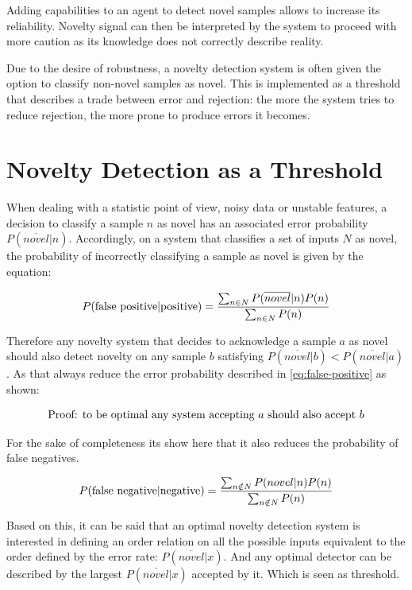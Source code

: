 Adding capabilities to an agent to detect novel samples allows to increase its
reliability. Novelty signal can then be interpreted by the system to proceed
with more caution as its knowledge does not correctly describe reality.

Due to the desire of robustness, a novelty detection system is often given the option
to classify non-novel samples as novel. This is implemented as a threshold that describes a trade
between error and rejection: the more the system tries to reduce rejection, the more
prone to produce errors it becomes.



\section{Novelty Detection as a Threshold}
When dealing with a statistic point of view, noisy data or unstable features,
a decision to classify a sample $n$ as novel has an associated error probability
$P(\overline{novel}|n)$.
Accordingly, on a system that classifies a set of inputs $N$ as novel, the
probability of incorrectly classifying a sample as novel is given by the
equation:

\begin{equation}
\label{eq:false-positive}
P(\textnormal{false positive}|\textnormal{positive}) = \frac{\sum_{n \in N}{P(\overline{novel}|n)P(n)}}{\sum_{n \in N}{P(n)}}
\end{equation}

Therefore any novelty system that decides to acknowledge a sample
$a$ as novel should also detect novelty on any sample $b$ satisfying
$P(\overline{novel}|b) < P(\overline{novel}|a)$.
As that always reduce the error probability described in
\autoref{eq:false-positive} as shown:

\begin{equation}
\textnormal{Proof: to be optimal any system accepting }a\textnormal{ should also accept }b
\end{equation}

For the sake of completeness its show here that it also reduces the probability
of false negatives.

\begin{equation}
P(\textnormal{false negative}|\textnormal{negative}) = \frac{\sum_{n \notin N}{P(novel|n)P(n)}}{\sum_{n \notin N}{P(n)}}
\end{equation}


Based on this, it can be said that an optimal novelty detection system is
interested in defining an order relation on all the possible inputs equivalent
to the order defined by the error rate: $P(\overline{novel}|x)$.
And any optimal detector can be described by the largest $P(\overline{novel}|x)$
accepted by it. Which is seen as threshold.


